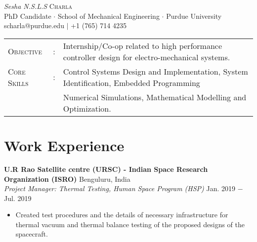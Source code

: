 \documentclass[letterpaper,10pt]{article}
\begin{document}
\begin{center}
\thispagestyle{empty}
\huge{\textit{Sesha N.S.L.S} \textsc{Charla}}\\
\small PhD Candidate $\cdot$ School of Mechanical Engineering $\cdot$ Purdue University\\
\small scharla@purdue.edu $\mid$ +1 (765) 714 4235   \\
\end{center}



\begin{tabular}{l c l}
    {\large{\textsc{Objective}}}&:& Internship$/$Co-op related to high performance controller design for electro-mechanical systems.\\
	{\large{\textsc{Core Skills}}}&:& Control Systems Design and Implementation, System Identification, Embedded Programming\\
    & &Numerical Simulations, Mathematical Modelling and Optimization.\\
\end{tabular}


\section{Work Experience}
\noindent \textbf{U.R Rao Satellite centre (URSC) - Indian Space Research Organization (ISRO)} \hfill Benguluru, India \\
\textit{Project Manager: Thermal Testing, Human Space Program (HSP)} \hfill Jan. 2019 $-$ Jul. 2019
\begin{itemize}[noitemsep,nolistsep,leftmargin=0.25in,label={--}]
    \item Created test procedures and the details of necessary infrastructure for thermal vacuum and thermal balance testing of the proposed designs of the spacecraft.
\end{itemize}
\end{document}
